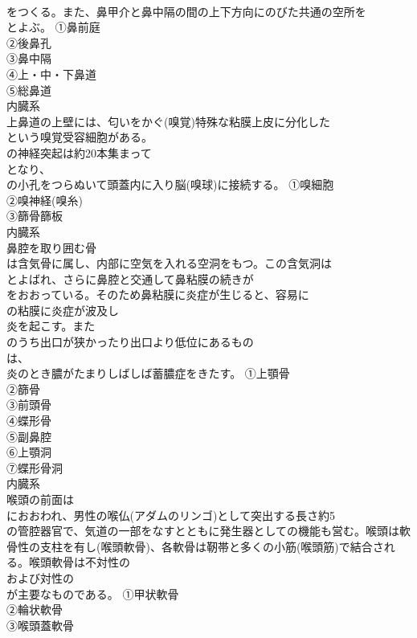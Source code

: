\documentclass[8pt]{extreport}
\begin{document}
\begin{CJK}{UTF8}{min}
\\	をつくる。また、鼻甲介と鼻中隔の間の上下方向にのびた共通の空所を
\\	とよぶ。	①鼻前庭
\\	②後鼻孔
\\	③鼻中隔
\\	④上・中・下鼻道
\\	⑤総鼻道
\\	内臓系
\\	上鼻道の上壁には、匂いをかぐ(嗅覚)特殊な粘膜上皮に分化した
\\	という嗅覚受容細胞がある。
\\	の神経突起は約20本集まって
\\	となり、
\\	の小孔をつらぬいて頭蓋内に入り脳(嗅球)に接続する。	①嗅細胞
\\	②嗅神経(嗅糸)
\\	③篩骨篩板
\\	内臓系
\\	鼻腔を取り囲む骨
\\	は含気骨に属し、内部に空気を入れる空洞をもつ。この含気洞は
\\	とよばれ、さらに鼻腔と交通して鼻粘膜の続きが
\\	をおおっている。そのため鼻粘膜に炎症が生じると、容易に
\\	の粘膜に炎症が波及し
\\	炎を起こす。また
\\	のうち出口が狭かったり出口より低位にあるもの
\\	は、
\\	炎のとき膿がたまりしばしば蓄膿症をきたす。	①上顎骨
\\	②篩骨
\\	③前頭骨
\\	④蝶形骨
\\	⑤副鼻腔
\\	⑥上顎洞
\\	⑦蝶形骨洞
\\	内臓系
\\	喉頭の前面は
\\	におおわれ、男性の喉仏(アダムのリンゴ)として突出する長さ約5
\\	の管腔器官で、気道の一部をなすとともに発生器としての機能も営む。喉頭は軟骨性の支柱を有し(喉頭軟骨)、各軟骨は靭帯と多くの小筋(喉頭筋)で結合される。喉頭軟骨は不対性の
\\	および対性の
\\	が主要なものである。	①甲状軟骨
\\	②輪状軟骨
\\	③喉頭蓋軟骨

\end{CJK}
\end{document}
